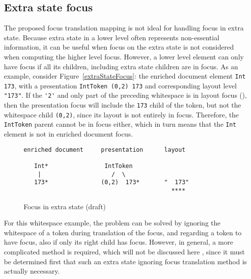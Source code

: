 %																
\subsection{Extra state focus}

The proposed focus translation mapping is not ideal for handling focus in extra state. Because extra state in a lower level often represents non-essential information, it can be useful when focus on the extra state is not considered when computing the higher level focus. However, a lower level element can only have focus if all its children, including extra state children are in focus. As an example, consider Figure~\ref{extraStateFocus}: the enriched document element \verb|Int 173|, with a presentation \verb|IntToken (0,2) 173| and corresponding layout level \verb|"|\textvisiblespace\textvisiblespace\verb|173"|. If the \verb|'2'| and only part of the preceding whitespace is in layout focus ({\tt \textvisiblespace{}}), then the presentation focus will include the \verb|173| child of the token, but not the whitespace child \verb|(0,2)|, since its layout is not entirely in focus. Therefore, the \verb|IntToken| parent cannot be in focus either, which in turn means that the \verb|Int| element is not in enriched document focus. 

\begin{figure}
\begin{small}
\begin{center}
\begin{verbatim}
enriched document     presentation      layout

   Int*                IntToken     
    |                    /  \    
   173*               (0,2)  173*       "  173"
                                          ****
\end{verbatim}
\caption{Focus in extra state (draft)}\label{extraStateFocusunpresentableFocus} 
\end{center}
\end{small}
\end{figure}

For this whitespace example, the problem can be solved by ignoring the whitespace of a token during translation of the focus, and regarding a token to have focus, also if only its right child has focus. However, in general, a more complicated method is required, which will not be discussed here , since it must be determined first that such an extra state ignoring focus translation method is actually necessary. 

